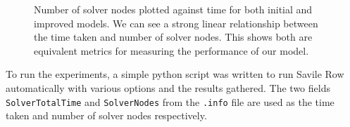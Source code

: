 \documentclass{article}
\begin{document}
\begin{figure}[H]
\begin{minipage}{0.4\textwidth}
\end{minipage}
\caption{Number of solver nodes plotted against time for both initial and improved models. We can see a strong linear relationship between the time taken and number of solver nodes. This shows both are equivalent metrics for measuring the performance of our model.}
\label{fig:solver-time}
\end{figure}
\noindent
To run the experiments, a simple python script was written to run Savile Row automatically with various options and the results gathered. The two fields \texttt{SolverTotalTime} and \texttt{SolverNodes} from the \texttt{.info} file are used as the time taken and number of solver nodes respectively.
\end{document}
